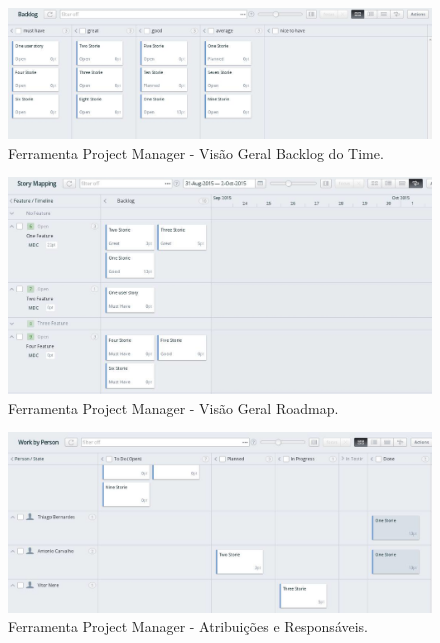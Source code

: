     \begin{figure}[H]
      \centering
    \includegraphics[keepaspectratio=true,scale=0.4]{figuras/ferramenta/pm_user_storie_4.eps}
      \caption{Ferramenta Project Manager - Visão Geral Backlog do Time.}
      \label{fig:progama}
    \end{figure}

    \begin{figure}[H]
      \centering
    \includegraphics[keepaspectratio=true,scale=0.4]{figuras/ferramenta/pm_user_storie_5.eps}
      \caption{Ferramenta Project Manager - Visão Geral Roadmap.}
      \label{fig:progama}
    \end{figure}

    \begin{figure}[H]
      \centering
    \includegraphics[keepaspectratio=true,scale=0.4]{figuras/ferramenta/pm_user_storie_6.eps}
      \caption{Ferramenta Project Manager - Atribuições e Responsáveis.}
      \label{fig:progama}
    \end{figure}
